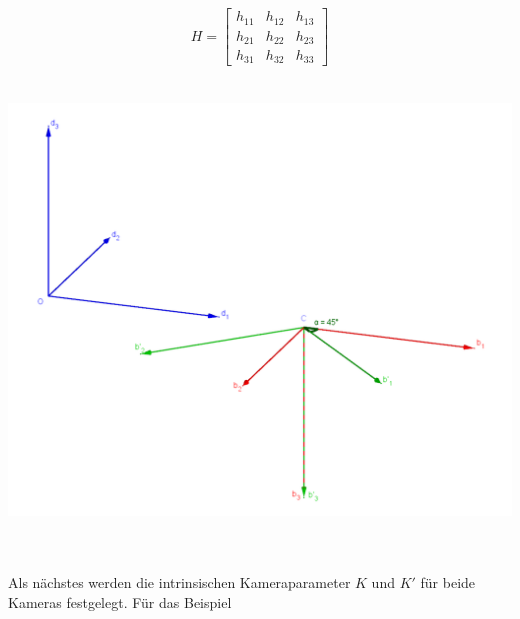 \begin{gather}
	H=
	\begin{bmatrix}
		h_{11}&h_{12}&h_{13}\\
		h_{21}&h_{22}&h_{23}\\
		h_{31}&h_{32}&h_{33}
	\end{bmatrix}
\end{gather}\\


\begin{minipage}{\linewidth}
	\centering
	\includegraphics[width=1.\linewidth]{images/GrafikHomographieSameC.png}
	\label{fig:Koordinatensysteme2}
\end{minipage}\\ \\

Als nächstes werden die intrinsischen Kameraparameter $K$ und $K'$ für beide Kameras festgelegt. Für das Beispiel

